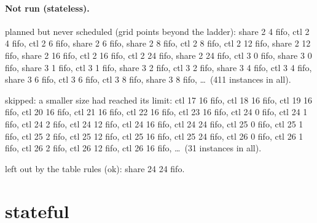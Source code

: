 \documentclass[10pt]{article}
\begin{document}
\paragraph{Not run (stateless).}
planned but never scheduled (grid points beyond the ladder): share 2 4 fifo, ctl 2 4 fifo, ctl 2 6 fifo, share 2 6 fifo, share 2 8 fifo, ctl 2 8 fifo, ctl 2 12 fifo, share 2 12 fifo, share 2 16 fifo, ctl 2 16 fifo, ctl 2 24 fifo, share 2 24 fifo, ctl 3 0 fifo, share 3 0 fifo, share 3 1 fifo, ctl 3 1 fifo, share 3 2 fifo, ctl 3 2 fifo, share 3 4 fifo, ctl 3 4 fifo, share 3 6 fifo, ctl 3 6 fifo, ctl 3 8 fifo, share 3 8 fifo, \ldots\ (411 instances in all).\par
skipped: a smaller size had reached its limit: ctl 17 16 fifo, ctl 18 16 fifo, ctl 19 16 fifo, ctl 20 16 fifo, ctl 21 16 fifo, ctl 22 16 fifo, ctl 23 16 fifo, ctl 24 0 fifo, ctl 24 1 fifo, ctl 24 2 fifo, ctl 24 12 fifo, ctl 24 16 fifo, ctl 24 24 fifo, ctl 25 0 fifo, ctl 25 1 fifo, ctl 25 2 fifo, ctl 25 12 fifo, ctl 25 16 fifo, ctl 25 24 fifo, ctl 26 0 fifo, ctl 26 1 fifo, ctl 26 2 fifo, ctl 26 12 fifo, ctl 26 16 fifo, \ldots\ (31 instances in all).\par
left out by the table rules (ok): share 24 24 fifo.\par
\section*{stateful}
\end{document}
